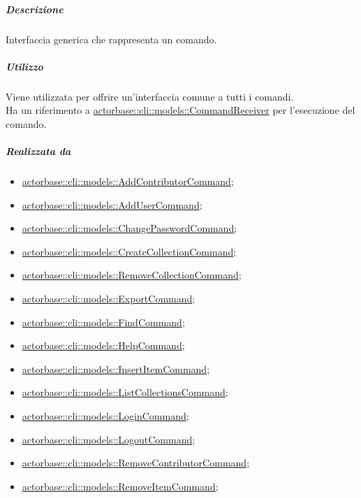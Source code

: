 \documentclass{scalatekids-article}
\begin{document}
\subparagraph{Descrizione}

Interfaccia generica che rappresenta un comando.

\subparagraph{Utilizzo}

Viene utilizzata per offrire un'interfaccia comune a tutti i comandi.\\Ha un
riferimento a \hyperref[sec:actorbase::cli::models::CommandReceiver]{actorbase::cli::models::CommandReceiver} per l'esecuzione del
comando.

\subparagraph{Realizzata da}

\begin{itemize}
\item \hyperref[sec:actorbase::cli::models::AddContributorCommand]{actorbase::cli::models::AddContributorCommand};
\item \hyperref[sec:actorbase::cli::models::AddUserCommand]{actorbase::cli::models::AddUserCommand};
\item  \hyperref[sec:actorbase::cli::models::ChangePasswordCommand]{actorbase::cli::models::ChangePasswordCommand};
\item  \hyperref[sec:actorbase::cli::models::CreateCollectionCommand]{actorbase::cli::models::CreateCollectionCommand};
\item  \hyperref[sec:actorbase::cli::models::RemoveCollectionCommand]{actorbase::cli::models::RemoveCollectionCommand};
\item  \hyperref[sec:actorbase::cli::models::ExportCommand]{actorbase::cli::models::ExportCommand};
\item  \hyperref[sec:actorbase::cli::models::FindCommand]{actorbase::cli::models::FindCommand};
\item  \hyperref[sec:actorbase::cli::models::HelpCommand]{actorbase::cli::models::HelpCommand};
\item  \hyperref[sec:actorbase::cli::models::InsertItemCommand]{actorbase::cli::models::InsertItemCommand};
\item  \hyperref[sec:actorbase::cli::models::ListCollectionsCommand]{actorbase::cli::models::ListCollectionsCommand};
\item  \hyperref[sec:actorbase::cli::models::LoginCommand]{actorbase::cli::models::LoginCommand};
\item  \hyperref[sec:actorbase::cli::models::LogoutCommand]{actorbase::cli::models::LogoutCommand};
\item  \hyperref[sec:actorbase::cli::models::RemoveContributorCommand]{actorbase::cli::models::RemoveContributorCommand};
\item  \hyperref[sec:actorbase::cli::models::RemoveItemCommand]{actorbase::cli::models::RemoveItemCommand};

\end{itemize}
\end{document}
